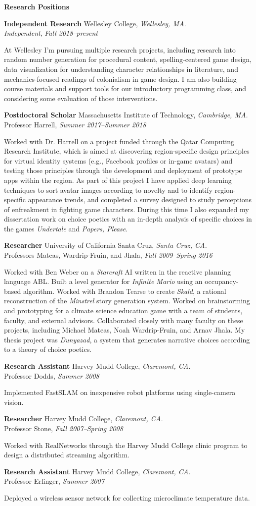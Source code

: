 \documentclass[11pt]{article}
\newenvironment{sct}[1]{%
  \vspace{8pt plus 2pt minus 4pt}\textbf{\Large #1} \hrulefill\vspace{6pt}
  \begin{adjustwidth}{6pt}{0pt}
}{%
  \end{adjustwidth}
}
\newcommand{\work}[1]{\textit{#1}\xspace}
\newcommand{\indented}[1]{\hspace*{\fill}\parbox{\textwidth-22pt}{#1}}
\newcommand{\experience}[6]{%
  \textbf{#1} #2, \textit{#3.} \\
  #4, \textit{#5} \\
  \indented{#6}
  \vspace{7pt plus 2pt minus 2pt}
}
\begin{document}
\begin{sct}{Research Positions}

\experience{Independent Research}{Wellesley College}{Wellesley, MA}%
{\emph{Independent}}{Fall 2018--present}{
  At Wellesley I'm pursuing multiple research projects, including research into
  random number generation for procedural content, spelling-centered game
  design, data visualization for understanding character relationships in
  literature, and mechanics-focused readings of colonialism in game design. I
  am also building course materials and support tools for our introductory
  programming class, and considering some evaluation of those interventions.
}

\newpage
\experience{Postdoctoral Scholar}{Massachusetts Institute of Technology}{Cambridge, MA}%
{Professor Harrell}{Summer 2017--Summer 2018}{
  Worked with Dr. Harrell on a project funded through the Qatar Computing
  Research Institute, which is aimed at discovering region-specific design
  principles for virtual identity systems (e.g., Facebook profiles or in-game
  avatars) and testing those principles through the development and deployment
  of prototype apps within the region. As part of this project I have applied
  deep learning techniques to sort avatar images according to novelty and to
  identify region-specific appearance trends, and completed a survey designed
  to study perceptions of enfreakment in fighting game characters. During this
  time I also expanded my dissertation work on choice poetics with an in-depth
  analysis of specific choices in the games \work{Undertale} and \work{Papers,
  Please}.
}

\experience{Researcher}{University of California Santa Cruz}{Santa Cruz, CA}%
{Professors Mateas, Wardrip-Fruin, and Jhala}{Fall 2009--Spring 2016}{
Worked with Ben Weber on a \work{Starcraft} AI written in the reactive planning
language ABL. Built a level generator for \work{Infinite Mario} using an
occupancy-based algorithm. Worked with Brandon Tearse to create \work{Skald}, a
rational reconstruction of the \work{Minstrel} story generation system. Worked
on brainstorming and prototyping for a climate science education game with a
team of students, faculty, and external advisors. Collaborated closely with
many faculty on these projects, including Michael Mateas, Noah Wardrip-Fruin,
and Arnav Jhala. My thesis project was \work{Dunyazad}, a system that generates
narrative choices according to a theory of choice poetics.
}

\experience{Research Assistant}{Harvey Mudd College}{Claremont, CA}%
{Professor Dodds}{Summer 2008}{
Implemented FastSLAM on inexpensive robot platforms using single-camera vision.
}

\experience{Researcher}{Harvey Mudd College}{Claremont, CA}%
{Professor Stone}{Fall 2007--Spring 2008}{
Worked with RealNetworks through the Harvey Mudd College clinic program to
design a distributed streaming algorithm.
}

\experience{Research Assistant}{Harvey Mudd College}{Claremont, CA}%
{Professor Erlinger}{Summer 2007}{
Deployed a wireless sensor network for collecting microclimate temperature data.
}

\end{sct}
\end{document}

